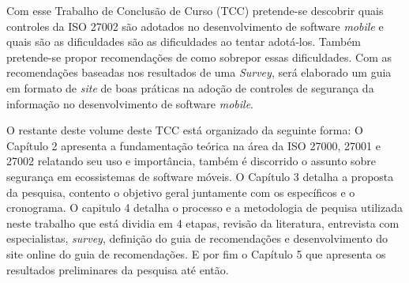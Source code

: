 
Com esse Trabalho de Conclusão de Curso (TCC) pretende-se descobrir quais controles da ISO 27002 são adotados no desenvolvimento de software \textit{mobile} e quais são as dificuldades são as dificuldades ao tentar adotá-los. Também pretende-se propor recomendações de como sobrepor essas dificuldades. Com as recomendações baseadas nos resultados de uma \textit{Survey}, será elaborado um guia em formato de \textit{site} de boas práticas na adoção de controles de segurança da informação no desenvolvimento de software \textit{mobile}.

O restante deste volume deste TCC está organizado da seguinte forma: O Capítulo 2 apresenta a fundamentação teórica na área da ISO 27000, 27001 e 27002 relatando seu uso e importância, também é discorrido o assunto sobre segurança em ecossistemas de software móveis. O Capítulo 3 detalha a proposta da pesquisa, contento o objetivo geral juntamente com os específicos e o cronograma. O capitulo 4 detalha o processo e a metodologia de pequisa utilizada neste trabalho que está dividia em 4 etapas, revisão da literatura, entrevista com especialistas, \textit{survey}, definição do guia de recomendações e desenvolvimento do site online do guia de recomendações. E por fim o Capítulo 5 que apresenta os resultados preliminares da pesquisa até então.  








 
